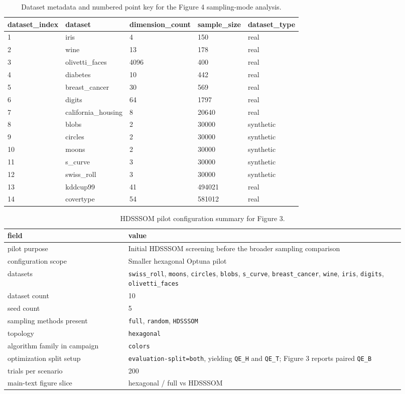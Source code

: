 \documentclass[10pt]{article} %
\begin{document}
\begin{table}[H]
\caption{Dataset metadata and numbered point key for the Figure 4 sampling-mode analysis.}
\label{tab:s1}
\centering
\small
\begin{tabular}{lllll}
\hline
dataset\_index & dataset & dimension\_count & sample\_size & dataset\_type \\
\hline
1 & iris & 4 & 150 & real \\
2 & wine & 13 & 178 & real \\
3 & olivetti\_faces & 4096 & 400 & real \\
4 & diabetes & 10 & 442 & real \\
5 & breast\_cancer & 30 & 569 & real \\
6 & digits & 64 & 1797 & real \\
7 & california\_housing & 8 & 20640 & real \\
8 & blobs & 2 & 30000 & synthetic \\
9 & circles & 2 & 30000 & synthetic \\
10 & moons & 2 & 30000 & synthetic \\
11 & s\_curve & 3 & 30000 & synthetic \\
12 & swiss\_roll & 3 & 30000 & synthetic \\
13 & kddcup99 & 41 & 494021 & real \\
14 & covertype & 54 & 581012 & real \\
\hline
\end{tabular}
\end{table}

\begin{table}[H]
\caption{HDSSSOM pilot configuration summary for Figure 3.}
\label{tab:s2}
\centering
\small
\begin{tabular}{p{0.28\linewidth}p{0.64\linewidth}}
\hline
field & value \\
\hline
pilot purpose & Initial HDSSSOM screening before the broader sampling comparison \\
configuration scope & Smaller hexagonal Optuna pilot \\
datasets & \texttt{swiss\_roll}, \texttt{moons}, \texttt{circles}, \texttt{blobs}, \texttt{s\_curve}, \texttt{breast\_cancer}, \texttt{wine}, \texttt{iris}, \texttt{digits}, \texttt{olivetti\_faces} \\
dataset count & 10 \\
seed count & 5 \\
sampling methods present & \texttt{full}, \texttt{random}, \texttt{HDSSSOM} \\
topology & \texttt{hexagonal} \\
algorithm family in campaign & \texttt{colors} \\
optimization split setup & \texttt{evaluation-split=both}, yielding \texttt{QE\_H} and \texttt{QE\_T}; Figure 3 reports paired \texttt{QE\_B} \\
trials per scenario & 200 \\
main-text figure slice & hexagonal / full vs HDSSSOM \\
\hline
\end{tabular}
\end{table}
\end{document}
